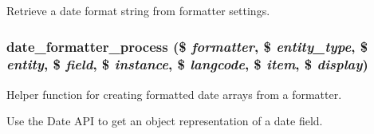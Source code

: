 \label{date_8module_a1fc73aa4ebc3a08f155eec42918f32c6}
Retrieve a date format string from formatter settings. \hypertarget{date_8module_a4b019297d5d8f388aa2252ad62b3bfde}{
\subsubsection[{date\_\-formatter\_\-process}]{\setlength{\rightskip}{0pt plus 5cm}date\_\-formatter\_\-process (\$ {\em formatter}, \/  \$ {\em entity\_\-type}, \/  \$ {\em entity}, \/  \$ {\em field}, \/  \$ {\em instance}, \/  \$ {\em langcode}, \/  \$ {\em item}, \/  \$ {\em display})}}
\label{date_8module_a4b019297d5d8f388aa2252ad62b3bfde}
Helper function for creating formatted date arrays from a formatter.

Use the Date API to get an object representation of a date field.


